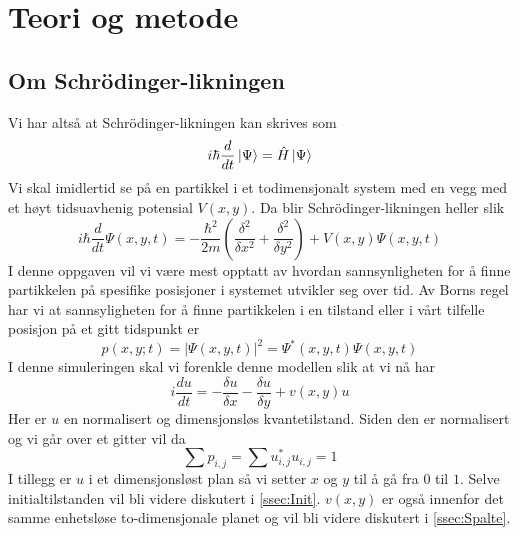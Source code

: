 \documentclass[reprint,english,notitlepage]{revtex4-2}  %
\begin{document}
\section{Teori og metode}   %

\subsection{Om Schrödinger-likningen}
Vi har altså at Schrödinger-likningen kan skrives som
$$
i\hbar\frac{d}{dt}\ket{\Psi}=\hat{H}\ket{\Psi}
$$
Vi skal imidlertid se på en partikkel i et todimensjonalt system med en vegg med et høyt tidsuavhenig potensial $V(x,y)$. Da blir Schrödinger-likningen heller slik
$$
i\hbar \frac{d}{dt}\Psi(x,y,t)=-\frac{\hbar^2}{2m}(\frac{\delta^2}{\delta x^2}+\frac{\delta^2}{\delta y^2})+V(x,y)\Psi(x,y,t)
$$
I denne oppgaven vil vi være mest opptatt av hvordan sannsynligheten for å finne partikkelen på spesifike posisjoner i systemet utvikler seg over tid. Av Borns regel har vi at sannsyligheten for å finne partikkelen i en tilstand eller i vårt tilfelle posisjon på et gitt tidspunkt er
$$
p(x,y;t)=|\Psi(x,y,t)|^2=\Psi^*(x,y,t)\Psi(x,y,t)
$$
I denne simuleringen skal vi forenkle denne modellen slik at vi nå har
$$
i\frac{d u}{dt}=-\frac{\delta u}{\delta x}-\frac{\delta u}{\delta y}+v(x,y)u
$$
Her er $u$ en normalisert og dimensjonsløs kvantetilstand. Siden den er normalisert og vi går over et gitter vil da
$$
\sum p_{i,j}=\sum u_{i,j}^*u_{i,j}=1
$$
I tillegg er $u$ i et dimensjonsløst plan så vi setter $x$ og $y$ til å gå fra $0$ til $1$. Selve initialtilstanden vil bli videre diskutert i \autoref{ssec:Init}. $v(x,y)$ er også innenfor det samme enhetsløse to-dimensjonale planet og vil bli videre diskutert i \autoref{ssec:Spalte}.
\end{document}
